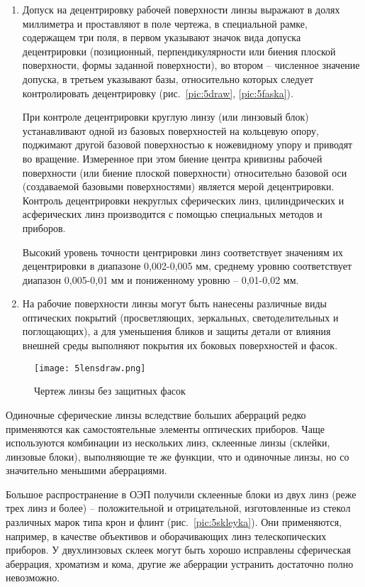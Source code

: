 \begin{enumerate}
	\item Допуск на децентрировку рабочей поверхности линзы выражают в долях миллиметра и проставляют в поле чертежа, в специальной рамке, содержащем три поля, в первом указывают значок вида допуска децентрировки (позиционный, перпендикулярности или биения плоской поверхности, формы заданной поверхности), во втором -- численное значение допуска, в третьем указывают базы, относительно которых следует контролировать децентрировку (рис.~\ref{pic:5draw}, \ref{pic:5faska}).
	
	При контроле децентрировки круглую линзу (или линзовый блок) устанавливают одной из базовых поверхностей на кольцевую опору, поджимают другой базовой поверхностью к ножевидному упору и приводят во вращение. Измеренное при этом биение центра кривизны рабочей поверхности (или биение плоской поверхности) относительно базовой оси (создаваемой базовыми поверхностями) является мерой децентрировки. Контроль децентрировки некруглых сферических линз, цилиндрических и асферических линз производится с помощью специальных методов и приборов.
	
	Высокий уровень точности центрировки линз соответствует значениям их децентрировки в диапазоне 0,002-0,005 мм, среднему уровню соответствует диапазон 0,005-0,01 мм и пониженному уровню -- 0,01-0,02 мм.
	
	\item На рабочие  поверхности  линзы  могут  быть нанесены различные виды оптических покрытий (просветляющих, зеркальных, светоделительных и поглощающих), а для уменьшения бликов и защиты детали от влияния внешней среды выполняют покрытия их боковых поверхностей и фасок.
\end{enumerate}

\begin{figure}[h!]
	\begin{center}
		\texttt{[image: 5lensdraw.png]}
		\caption{Чертеж линзы без защитных фасок}
		\label{pic:5lensdraw}
	\end{center}
\end{figure}

Одиночные сферические линзы вследствие больших аберраций редко применяются как самостоятельные элементы оптических приборов. Чаще используются комбинации из нескольких линз, склеенные линзы (склейки, линзовые блоки), выполняющие те же функции, что и одиночные линзы, но со значительно меньшими аберрациями.

Большое распространение в ОЭП получили склеенные блоки из двух линз (реже трех линз и более) -- положительной и отрицательной, изготовленные из стекол различных марок типа крон и флинт (рис.~\ref{pic:5skleyka}). Они применяются, например, в качестве объективов и оборачивающих линз телескопических приборов. У двухлинзовых склеек могут быть хорошо исправлены сферическая аберрация, хроматизм и кома, другие же аберрации устранить достаточно полно невозможно.

